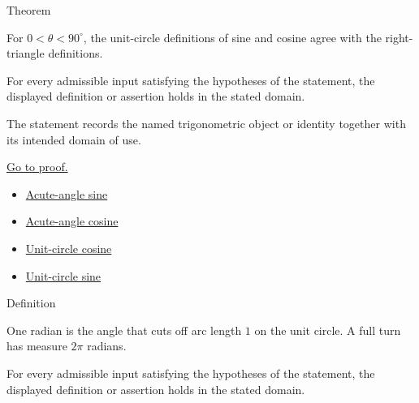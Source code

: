 \begin{theorembox}{Theorem}
\begin{theorem}
\label{thm:unit-circle-agrees-with-right-triangle-trig}
For $0<\theta<90^\circ$, the unit-circle definitions of sine and cosine agree
with the right-triangle definitions.
\end{theorem}
\end{theorembox}
\begin{remark*}
For every admissible input satisfying the hypotheses of the statement, the
displayed definition or assertion holds in the stated domain.
\end{remark*}

\begin{remark*}[Interpretation]
The statement records the named trigonometric object or identity together with
its intended domain of use.
\end{remark*}

\begin{remark*}[Proof]
\hyperref[prf:unit-circle-agrees-with-right-triangle-trig]{Go to proof.}
\end{remark*}
\begin{dependencies}
\begin{itemize}
  \item \hyperref[def:acute-angle-sine]{Acute-angle sine}
  \item \hyperref[def:acute-angle-cosine]{Acute-angle cosine}
  \item \hyperref[def:unit-circle-cosine]{Unit-circle cosine}
  \item \hyperref[def:unit-circle-sine]{Unit-circle sine}
\end{itemize}
\end{dependencies}



\begin{definitionbox}{Definition}
\begin{definition}
\label{def:radian-measure}
One radian is the angle that cuts off arc length $1$ on the unit circle. A full
turn has measure $2\pi$ radians.
\end{definition}
\end{definitionbox}
\begin{remark*}
For every admissible input satisfying the hypotheses of the statement, the
displayed definition or assertion holds in the stated domain.
\end{remark*}

